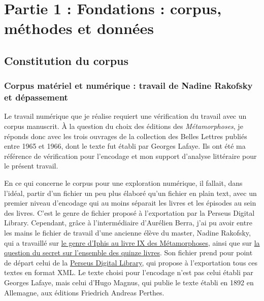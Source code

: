 \documentclass[
  letterpaper,
  DIV=11,
  numbers=noendperiod]{scrreprt}
\begin{document}
\chapter{\textbar{} Partie 1 : Fondations : corpus, méthodes et
données}\label{partie-1-fondations-corpus-muxe9thodes-et-donnuxe9es}

\section{Constitution du corpus}\label{constitution-du-corpus}

\subsection{Corpus matériel et numérique : travail de Nadine Rakofsky et
dépassement}\label{corpus-matuxe9riel-et-numuxe9rique-travail-de-nadine-rakofsky-et-duxe9passement}

Le travail numérique que je réalise requiert une vérification du travail
avec un corpus manuscrit. À la question du choix des éditions des
\emph{Métamorphoses}, je réponds donc avec les trois ouvrages de la
collection des Belles Lettres publiés entre 1965 et 1966, dont le texte
fut établi par Georges Lafaye. Ils ont été ma référence de vérification
pour l'encodage et mon support d'analyse littéraire pour le présent
travail.

En ce qui concerne le corpus pour une exploration numérique, il fallait,
dans l'idéal, partir d'un fichier un peu plus élaboré qu'un fichier en
plain text, avec un premier niveau d'encodage qui au moins séparait les
livres et les épisodes au sein des livres. C'est le genre de fichier
proposé à l'exportation par la Perseus Digital Library. Cependant, grâce
à l'intermédiaire d'Aurélien Berra, j'ai pu avoir entre les mains le
fichier de travail d'une ancienne élève du master, Nadine Rakofsky, qui
a travaillé sur \href{https://classnum.hypotheses.org/6414}{le genre
d'Iphis au livre IX des Métamorphoses}, ainsi que sur
\href{https://classnum.hypotheses.org/6455}{la question du secret sur
l'ensemble des quinze livres}. Son fichier prend pour point de départ
celui de la \href{https://www.perseus.tufts.edu/hopper/}{Perseus Digital
Library}, qui propose à l'exportation tous ces textes en format XML. Le
texte choisi pour l'encodage n'est pas celui établi par Georges Lafaye,
mais celui d'Hugo Magnus, qui publie le texte établi en 1892 en
Allemagne, aux éditions Friedrich Andreas Perthes.
\end{document}
